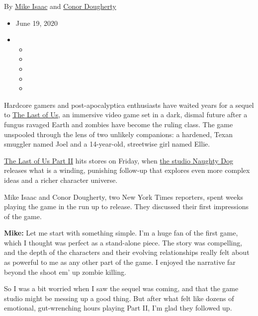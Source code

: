 By \href{https://www.nytimes3xbfgragh.onion/by/mike-isaac}{Mike Isaac}
and \href{https://www.nytimes3xbfgragh.onion/by/conor-dougherty}{Conor
Dougherty}

\begin{itemize}
\item
  June 19, 2020
\item
  \begin{itemize}
  \item
  \item
  \item
  \item
  \item
  \end{itemize}
\end{itemize}

Hardcore gamers and post-apocalyptica enthusiasts have waited years for
a sequel to
\href{https://www.nytimes3xbfgragh.onion/2013/06/14/arts/video-games/in-the-video-game-the-last-of-us-survival-favors-the-man.html}{The
Last of Us}, an immersive video game set in a dark, dismal future after
a fungus ravaged Earth and zombies have become the ruling class. The
game unspooled through the lens of two unlikely companions: a hardened,
Texan smuggler named Joel and a 14-year-old, streetwise girl named
Ellie.

\href{https://www.nytimes3xbfgragh.onion/2020/06/19/business/last-of-us-2-review.html}{The
Last of Us Part II} hits stores on Friday, when
\href{https://www.nytimes3xbfgragh.onion/2020/04/21/technology/personaltech/coronavirus-video-game-production.html}{the
studio Naughty Dog} releases what is a winding, punishing follow-up that
explores even more complex ideas and a richer character universe.

Mike Isaac and Conor Dougherty, two New York Times reporters, spent
weeks playing the game in the run up to release. They discussed their
first impressions of the game.

\textbf{Mike:} Let me start with something simple. I'm a huge fan of the
first game, which I thought was perfect as a stand-alone piece. The
story was compelling, and the depth of the characters and their evolving
relationships really felt about as powerful to me as any other part of
the game. I enjoyed the narrative far beyond the shoot em' up zombie
killing.

So I was a bit worried when I saw the sequel was coming, and that the
game studio might be messing up a good thing. But after what felt like
dozens of emotional, gut-wrenching hours playing Part II, I'm glad they
followed up.

